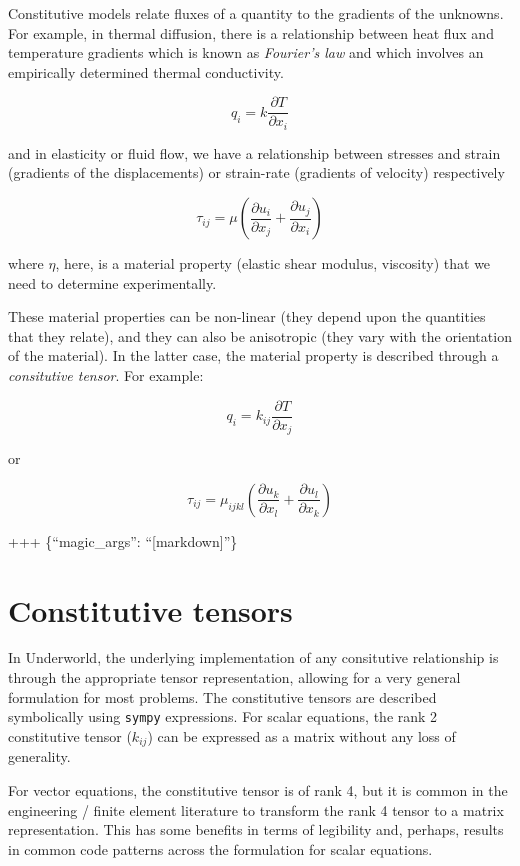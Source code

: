 \documentclass[
  letterpaper,
  DIV=11,
  numbers=noendperiod]{scrreprt}
\begin{document}
Constitutive models relate fluxes of a quantity to the gradients of the
unknowns. For example, in thermal diffusion, there is a relationship
between heat flux and temperature gradients which is known as
\emph{Fourier's law} and which involves an empirically determined
thermal conductivity.

\[ q_i = k \frac{ \partial T}{\partial x_i} \]

and in elasticity or fluid flow, we have a relationship between stresses
and strain (gradients of the displacements) or strain-rate (gradients of
velocity) respectively

\[ \tau_{ij} = \mu \left( \frac{\partial u_i}{\partial x_j} + \frac{\partial u_j}{\partial x_i} \right) \]

where \(\eta\), here, is a material property (elastic shear modulus,
viscosity) that we need to determine experimentally.

These material properties can be non-linear (they depend upon the
quantities that they relate), and they can also be anisotropic (they
vary with the orientation of the material). In the latter case, the
material property is described through a \emph{consitutive tensor}. For
example:

\[ q_i = k_{ij} \frac{ \partial T}{\partial x_j} \]

or

\[ \tau_{ij} = \mu_{ijkl} \left( \frac{\partial u_k}{\partial x_l} + \frac{\partial u_l}{\partial x_k} \right) \]

+++ \{``magic\_args'': ``{[}markdown{]}''\}

\section{Constitutive tensors}\label{constitutive-tensors}

In Underworld, the underlying implementation of any consitutive
relationship is through the appropriate tensor representation, allowing
for a very general formulation for most problems. The constitutive
tensors are described symbolically using \texttt{sympy} expressions. For
scalar equations, the rank 2 constitutive tensor (\(k_{ij}\)) can be
expressed as a matrix without any loss of generality.

For vector equations, the constitutive tensor is of rank 4, but it is
common in the engineering / finite element literature to transform the
rank 4 tensor to a matrix representation. This has some benefits in
terms of legibility and, perhaps, results in common code patterns across
the formulation for scalar equations.
\end{document}
